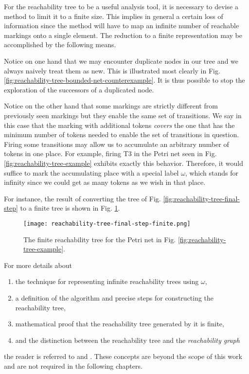 \documentclass[../Thesis.tex]{subfiles}
\begin{document}
For the reachability tree to be a useful analysis tool,
it is necessary to devise a method to limit it to a finite size.
This implies in general a certain loss of information since the method will have to map
an infinite number of reachable markings onto a single element.
The reduction to a finite representation may be accomplished by the following means.

Notice on one hand that we may encounter duplicate nodes
in our tree and we always naively treat them as new.
This is illustrated most clearly in Fig. \ref{fig:reachability-tree-bounded-net-counterexample}.
It is thus possible to stop the exploration of the successors of a duplicated node.

Notice on the other hand that some markings are strictly different from previously seen markings
but they enable the same set of transitions.
We say in this case that the marking with additional tokens \emph{covers} the one
that has the minimum number of tokens needed to enable the set of transitions in question.
Firing some transitions may allow us to accumulate an arbitrary number of tokens in one place.
For example, firing T3 in the Petri net seen in
Fig. \ref{fig:reachability-tree-example} exhibits exactly this behavior.
Therefore, it would suffice to mark the accumulating place
with a special label $\omega$, which stands for infinity
since we could get as many tokens as we wish in that place.

For instance, the result of converting the tree of Fig. \ref{fig:reachability-tree-final-step}
to a finite tree is shown in Fig. \ref{fig:reachability-tree-final-step-finite}.

\begin{figure}[!htb]
    \centering
    \texttt{[image: reachability-tree-final-step-finite.png]}
    \caption{The finite reachability tree for the Petri net in Fig.
        \ref{fig:reachability-tree-example}.}
    \label{fig:reachability-tree-final-step-finite}
\end{figure}

For more details about

\begin{enumerate}
    \item the technique for representing infinite reachability trees using $\omega$,
    \item a definition of the algorithm and precise steps for constructing the reachability tree,
    \item mathematical proof that the reachability tree generated by it is finite,
    \item and the distinction between the reachability tree and the \emph{reachability graph}
\end{enumerate}

the reader is referred to \cite{murata1989} and \cite{peterson1981}.
These concepts are beyond the scope of this work
and are not required in the following chapters.
\end{document}
